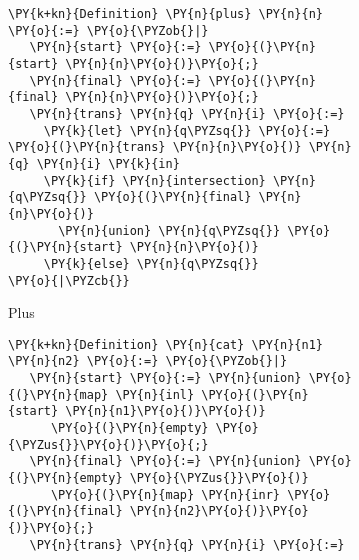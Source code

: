 \begin{figure}
\begin{minipage}{0.4\textwidth}
\begin{subfigure}{1.0\textwidth}
  \centering
\begin{Verbatim}[commandchars=\\\{\}]
\PY{k+kn}{Definition} \PY{n}{plus} \PY{n}{n} \PY{o}{:=} \PY{o}{\PYZob{}|}
   \PY{n}{start} \PY{o}{:=} \PY{o}{(}\PY{n}{start} \PY{n}{n}\PY{o}{)}\PY{o}{;}
   \PY{n}{final} \PY{o}{:=} \PY{o}{(}\PY{n}{final} \PY{n}{n}\PY{o}{)}\PY{o}{;}
   \PY{n}{trans} \PY{n}{q} \PY{n}{i} \PY{o}{:=}
     \PY{k}{let} \PY{n}{q\PYZsq{}} \PY{o}{:=} \PY{o}{(}\PY{n}{trans} \PY{n}{n}\PY{o}{)} \PY{n}{q} \PY{n}{i} \PY{k}{in}
     \PY{k}{if} \PY{n}{intersection} \PY{n}{q\PYZsq{}} \PY{o}{(}\PY{n}{final} \PY{n}{n}\PY{o}{)}
       \PY{n}{union} \PY{n}{q\PYZsq{}} \PY{o}{(}\PY{n}{start} \PY{n}{n}\PY{o}{)}
     \PY{k}{else} \PY{n}{q\PYZsq{}}
\PY{o}{|\PYZcb{}}
\end{Verbatim}
\caption{Plus}
\end{subfigure}
\end{minipage}
%
\hspace{3em}
\begin{minipage}{0.6\textwidth}
%
\begin{subfigure}{1.0\textwidth}
  \centering
\begin{Verbatim}[commandchars=\\\{\}]
\PY{k+kn}{Definition} \PY{n}{cat} \PY{n}{n1} \PY{n}{n2} \PY{o}{:=} \PY{o}{\PYZob{}|}
   \PY{n}{start} \PY{o}{:=} \PY{n}{union} \PY{o}{(}\PY{n}{map} \PY{n}{inl} \PY{o}{(}\PY{n}{start} \PY{n}{n1}\PY{o}{)}\PY{o}{)}
      \PY{o}{(}\PY{n}{empty} \PY{o}{\PYZus{}}\PY{o}{)}\PY{o}{;}
   \PY{n}{final} \PY{o}{:=} \PY{n}{union} \PY{o}{(}\PY{n}{empty} \PY{o}{\PYZus{}}\PY{o}{)}
      \PY{o}{(}\PY{n}{map} \PY{n}{inr} \PY{o}{(}\PY{n}{final} \PY{n}{n2}\PY{o}{)}\PY{o}{)}\PY{o}{;}
   \PY{n}{trans} \PY{n}{q} \PY{n}{i} \PY{o}{:=}

\end{Verbatim}
\end{subfigure}
\end{minipage}
\end{figure}
